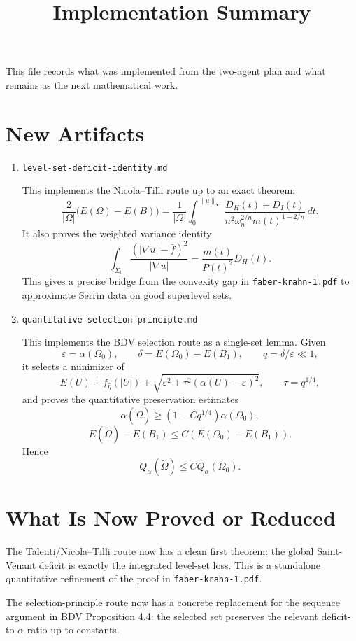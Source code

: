 \documentclass[11pt]{article}
\title{Implementation Summary}
\author{}
\date{}
\begin{document}
\maketitle

This file records what was implemented from the two-agent plan and what remains
as the next mathematical work.

\section{New Artifacts}

\begin{enumerate}
\item \texttt{level-set-deficit-identity.md}

This implements the Nicola--Tilli route up to an exact theorem:
\[
\frac{2}{|\Omega|}\big(E(\Omega)-E(B)\big)
=
\frac1{|\Omega|}
\int_0^{\|u\|_\infty}
\frac{D_H(t)+D_I(t)}
{n^2\omega_n^{2/n}m(t)^{1-2/n}}\,dt.
\]
It also proves the weighted variance identity
\[
\int_{\Sigma_t}
\frac{(|\nabla u|-\bar f)^2}{|\nabla u|}
=
\frac{m(t)}{P(t)^2}D_H(t).
\]
This gives a precise bridge from the convexity gap in
\texttt{faber-krahn-1.pdf} to approximate Serrin data on good superlevel sets.

\item \texttt{quantitative-selection-principle.md}

This implements the BDV selection route as a single-set lemma. Given
\[
\varepsilon=\alpha(\Omega_0),\qquad
\delta=E(\Omega_0)-E(B_1),\qquad
q=\delta/\varepsilon\ll1,
\]
it selects a minimizer of
\[
E(U)+f_{\hat\eta}(|U|)
+\sqrt{\varepsilon^2+\tau^2(\alpha(U)-\varepsilon)^2},
\qquad
\tau=q^{1/4},
\]
and proves the quantitative preservation estimates
\[
\alpha(\widetilde\Omega)
\ge
(1-Cq^{1/4})\alpha(\Omega_0),
\]
\[
E(\widetilde\Omega)-E(B_1)
\le
C(E(\Omega_0)-E(B_1)).
\]
Hence
\[
Q_\alpha(\widetilde\Omega)
\le
C Q_\alpha(\Omega_0).
\]
\end{enumerate}

\section{What Is Now Proved or Reduced}

The Talenti/Nicola--Tilli route now has a clean first theorem: the global
Saint-Venant deficit is exactly the integrated level-set loss. This is a
standalone quantitative refinement of the proof in \texttt{faber-krahn-1.pdf}.

The selection-principle route now has a concrete replacement for the sequence
argument in BDV Proposition 4.4: the selected set preserves the relevant
deficit-to-\(\alpha\) ratio up to constants.
\end{document}
